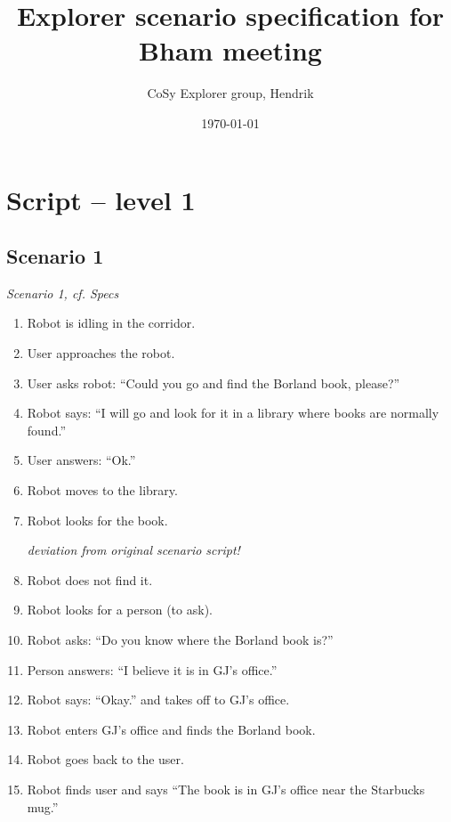 \documentclass{article}
\title{Explorer scenario specification for Bham meeting}
\date{\today}
\author{CoSy Explorer group, Hendrik}
\begin{document}
\maketitle

\section{Script -- level 1}
\subsection{Scenario 1}
\label{scen1}
\textit{Scenario 1, cf. Specs}

\begin{enumerate}
\item Robot is idling in the corridor. 
\item User approaches the robot.
\item \label{lvl1:user_asks_1}
	User asks robot: ``Could you go and find the Borland book, please?''
\item \label{lvl1:rob_answs_1}
  	Robot says: ``I will go and look for it in a library where books are normally found.''
\item \label{lvl1:user_answs_2}
	User answers: ``Ok.''
\item \label{lvl1:rob_goes_lib}
	Robot moves to the library.
\item \label{lvl1:look_for_book}
	Robot looks for the book.


\emph{deviation from original scenario script!}
\item \label{lvl1:not_find_book}
	Robot does not find it.
\item \label{lvl1:look_for_person}
	Robot looks for a person (to ask).
\item \label{lvl1:}
	Robot asks: ``Do you know where the Borland book is?''
\item 
	Person answers: ``I believe it is in GJ's office.''
\item
	Robot says: ``Okay.'' and takes off to GJ's office.
	
\item 
	Robot enters GJ's office and finds the Borland book.
\item
	Robot goes back to the user.
\item
	Robot finds user and says ``The book is in GJ's office near the Starbucks mug.''
	
\end{enumerate}


\end{document}
